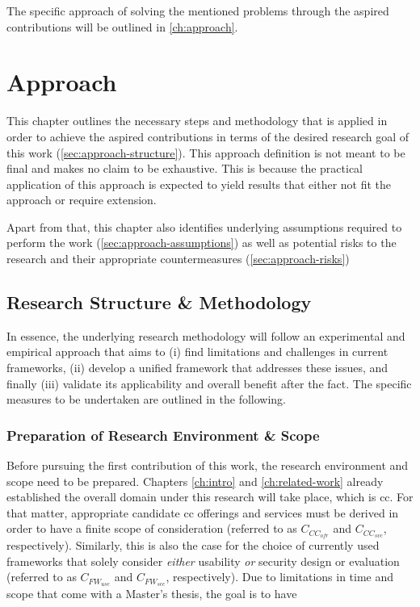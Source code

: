 The specific approach of solving the mentioned problems through the aspired contributions will be outlined in \autoref{ch:approach}.



\chapter{Approach}
\label{ch:approach}

This chapter outlines the necessary steps and methodology that is applied in order to achieve the aspired contributions in terms of the desired research goal of this work (\autoref{sec:approach-structure}). This approach definition is not meant to be final and makes no claim to be exhaustive. This is because the practical application of this approach is expected to yield results that either not fit the approach or require extension.

Apart from that, this chapter also identifies underlying assumptions required to perform the work (\autoref{sec:approach-assumptions}) as well as potential risks to the research and their appropriate countermeasures (\autoref{sec:approach-risks})

\section{Research Structure \& Methodology} \label{sec:approach-structure}

In essence, the underlying research methodology will follow an experimental and empirical approach that aims to (i) find limitations and challenges in current frameworks, (ii) develop a unified framework that addresses these issues, and finally (iii) validate its applicability and overall benefit after the fact. The specific measures to be undertaken are outlined in the following.

\subsection{Preparation of Research Environment \& Scope} \label{subs:approach-structure-prepare}

Before pursuing the first contribution of this work, the research environment and scope need to be prepared. Chapters \ref{ch:intro} and \ref{ch:related-work} already established the overall domain under this research will take place, which is \acl{cc}. For that matter, appropriate candidate \ac{cc} offerings and services must be derived in order to have a finite scope of consideration (referred to as $C_{CC_{ofr}}$ and $C_{CC_{svc}}$, respectively). Similarly, this is also the case for the choice of currently used frameworks that solely consider \textit{either} usability \textit{or} security design or evaluation (referred to as $C_{FW_{use}}$ and $C_{FW_{sec}}$, respectively).
Due to limitations in time and scope that come with a Master's thesis, the goal is to have 

